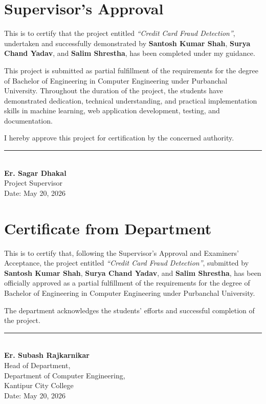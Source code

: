 \documentclass[12pt,a4paper]{report}
\newcommand{\projecttitle}{Credit Card Fraud Detection}
\newcommand{\projectdate}{May 20, 2026}
\newcommand{\supervisor}{Er. Sagar Dhakal}
\newcommand{\department}{Department of Computer Engineering}
\newcommand{\college}{Kantipur City College}
\begin{document}
\newpage

\chapter*{Supervisor's Approval}

This is to certify that the project entitled \textit{``\projecttitle''}, undertaken and successfully demonstrated by \textbf{Santosh Kumar Shah}, \textbf{Surya Chand Yadav}, and \textbf{Salim Shrestha}, has been completed under my guidance.

This project is submitted as partial fulfillment of the requirements for the degree of Bachelor of Engineering in Computer Engineering under Purbanchal University. Throughout the duration of the project, the students have demonstrated dedication, technical understanding, and practical implementation skills in machine learning, web application development, testing, and documentation.

I hereby approve this project for certification by the concerned authority.

\vspace{2cm}
\noindent\rule{5cm}{0.4pt}\\[0.2cm]
\textbf{\supervisor}\\
Project Supervisor\\[0.4cm]
Date: \projectdate

\newpage

\chapter*{Certificate from Department}

This is to certify that, following the Supervisor's Approval and Examiners' Acceptance, the project entitled \textit{``\projecttitle''}, submitted by \textbf{Santosh Kumar Shah}, \textbf{Surya Chand Yadav}, and \textbf{Salim Shrestha}, has been officially approved as a partial fulfillment of the requirements for the degree of Bachelor of Engineering in Computer Engineering under Purbanchal University.

The department acknowledges the students' efforts and successful completion of the project.

\vspace{2cm}
\noindent\rule{5cm}{0.4pt}\\[0.2cm]
\textbf{Er. Subash Rajkarnikar}\\
Head of Department,\\
\department,\\
\college\\[0.4cm]
Date: \projectdate
\end{document}
